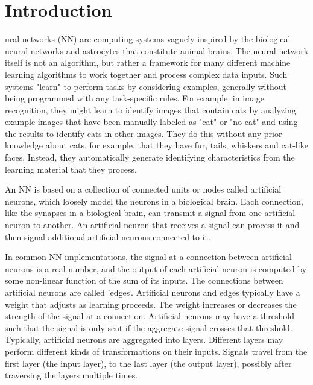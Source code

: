\documentclass[journal]{IEEEtran}
\begin{document}
\section{Introduction}

ural networks (NN) are computing systems vaguely inspired by the biological neural networks and astrocytes that constitute animal brains. The neural network itself is not an algorithm, but rather a framework for many different machine learning algorithms to work together and process complex data inputs. Such systems "learn" to perform tasks by considering examples, generally without being programmed with any task-specific rules. For example, in image recognition, they might learn to identify images that contain cats by analyzing example images that have been manually labeled as "cat" or "no cat" and using the results to identify cats in other images. They do this without any prior knowledge about cats, for example, that they have fur, tails, whiskers and cat-like faces. Instead, they automatically generate identifying characteristics from the learning material that they process.

An NN is based on a collection of connected units or nodes called artificial neurons, which loosely model the neurons in a biological brain. Each connection, like the synapses in a biological brain, can transmit a signal from one artificial neuron to another. An artificial neuron that receives a signal can process it and then signal additional artificial neurons connected to it.

In common NN implementations, the signal at a connection between artificial neurons is a real number, and the output of each artificial neuron is computed by some non-linear function of the sum of its inputs. The connections between artificial neurons are called 'edges'. Artificial neurons and edges typically have a weight that adjusts as learning proceeds. The weight increases or decreases the strength of the signal at a connection. Artificial neurons may have a threshold such that the signal is only sent if the aggregate signal crosses that threshold. Typically, artificial neurons are aggregated into layers. Different layers may perform different kinds of transformations on their inputs. Signals travel from the first layer (the input layer), to the last layer (the output layer), possibly after traversing the layers multiple times.
\end{document}
